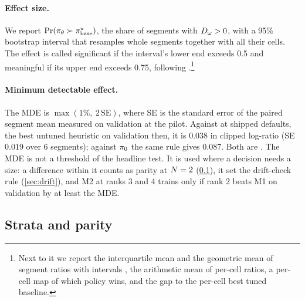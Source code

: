 \paragraph{Effect size.}
We report $\Pr(\pi_{\theta} \succ \pi^{\star}_{\mathrm{base}})$, the share of segments with $D_{\omega} > 0$, with a
95\% bootstrap interval that resamples whole segments together with all their cells. The effect is
called significant if the interval's lower end exceeds 0.5 and meaningful if its upper end exceeds
0.75, following \citet{bouthillier2021variance}.\footnote{Next to it we report the interquartile
  mean and the geometric mean of segment ratios with intervals \citep{agarwal2021precipice}, the
  arithmetic mean of per-cell ratios, a per-cell map of which policy wins, and the gap to the
  per-cell best tuned baseline.}

\paragraph{Minimum detectable effect.}
The MDE is $\max(1\%,\ 2\,\mathrm{SE})$, where SE is the standard error of the paired segment mean
measured on validation at the pilot. Against  at shipped defaults, the
best untuned heuristic on validation then, it is 0.038 in clipped log-ratio (SE 0.019 over 6
segments); against $\pi_{0}$ the same rule gives 0.087. Both are \prelim. The MDE is not a
threshold of the headline test. It is used where a decision needs a size: a difference within it
counts as parity at $N = 2$ (\cref{sec:strata}), it set the drift-check rule
(\cref{sec:drift}), and M2 at ranks 3 and 4 trains only if rank 2 beats M1 on validation by at
least the MDE.

\subsection{Strata and parity}
\label{sec:strata}

